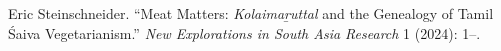 Eric Steinschneider. “Meat Matters: \emph{Kolaimaṟuttal} and the Genealogy of Tamil Śaiva Vegetarianism.” \emph{New Explorations in South Asia Research} 1 (2024): 1–.